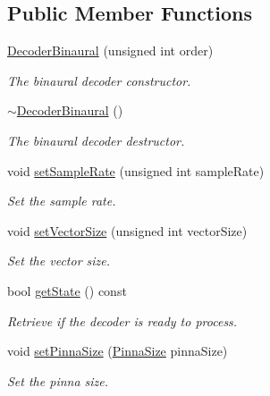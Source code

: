 \subsection*{Public Member Functions}
\begin{DoxyCompactItemize}
\item 
\hyperlink{class_hoa2_d_1_1_decoder_binaural_a614b402069c035eb1bb03d3ec79c4098}{Decoder\-Binaural} (unsigned int order)
\begin{DoxyCompactList}\small\item\em The binaural decoder constructor. \end{DoxyCompactList}\item 
\hyperlink{class_hoa2_d_1_1_decoder_binaural_a3aa8b84a571c2c031dcae2b94b8737e4}{$\sim$\-Decoder\-Binaural} ()
\begin{DoxyCompactList}\small\item\em The binaural decoder destructor. \end{DoxyCompactList}\item 
void \hyperlink{class_hoa2_d_1_1_decoder_binaural_a6a96a705952a4165dd916c74b64b60e4}{set\-Sample\-Rate} (unsigned int sample\-Rate)
\begin{DoxyCompactList}\small\item\em Set the sample rate. \end{DoxyCompactList}\item 
void \hyperlink{class_hoa2_d_1_1_decoder_binaural_a0c5dd214c4d8661439098d8d2031ecb9}{set\-Vector\-Size} (unsigned int vector\-Size)
\begin{DoxyCompactList}\small\item\em Set the vector size. \end{DoxyCompactList}\item 
bool \hyperlink{class_hoa2_d_1_1_decoder_binaural_a8cb958da4f7f5f5888cd894a52f69aa5}{get\-State} () const 
\begin{DoxyCompactList}\small\item\em Retrieve if the decoder is ready to process. \end{DoxyCompactList}\item 
void \hyperlink{class_hoa2_d_1_1_decoder_binaural_ab64849cdd2b3d0b3d872271c95b1860d}{set\-Pinna\-Size} (\hyperlink{class_hoa2_d_1_1_decoder_binaural_a29505dfc8fda1797dc2b059530f2383a}{Pinna\-Size} pinna\-Size)
\begin{DoxyCompactList}\small\item\em Set the pinna size. \end{DoxyCompactList}\item 

\end{DoxyCompactItemize}
